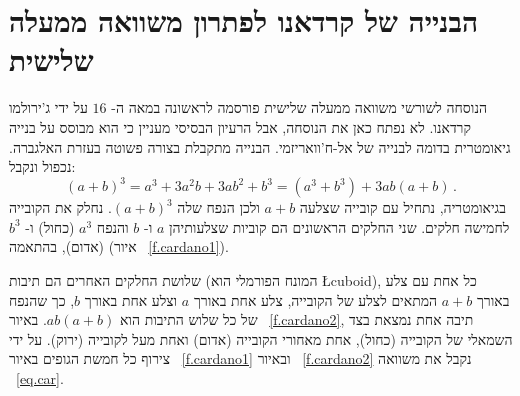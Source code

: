 
\section{הבנייה של
קרדאנו
לפתרון משוואה ממעלה שלישית}
\label{s.cardano}

הנוסחה לשורשי משוואה ממעלה שלישית פורסמה לראשונה במאה ה-%
$16$
על ידי ג'ירולמו קרדאנו.
לא נפתח כאן את הנוסחה, אבל הרעיון הבסיסי מעניין כי הוא מבוסס על בנייה גיאומטרית בדומה לבנייה של אל-ח'וואריזמי.
הבנייה מתקבלת בצורה פשוטה בעזרת האלגברה. נכפול ונקבל:
\begin{equation}\label{eq.car}
(a+b)^3=a^3+3a^2b+3ab^2+b^3=(a^3+b^3)+3ab(a+b)\,.
\end{equation}
בגיאומטריה, נתחיל עם קובייה שצלעה 
$a+b$
ולכן הנפח שלה 
$(a+b)^3$.
נחלק את הקובייה לחמישה חלקים. שני החלקים הראשונים הם קוביות שצלעותיהן  
$a$
ו-%
$b$
והנפח
$a^3$ (כחול)
ו-%
$b^3$ (אדום),
בהתאמה (איור%
~\ref{f.cardano1}).

שלושת החלקים האחרים הם תיבות (המונח הפורמלי הוא
\L{cuboid}),
כל אחת עם צלע באורך
$a+b$
המתאים לצלע של הקובייה, צלע אחת באורך
$a$
וצלע אחת באורך
$b$,
כך שהנפח של כל שלוש התיבות הוא
$ab(a+b)$.
באיור%
~\ref{f.cardano2},
תיבה אחת נמצאת בצד השמאלי של הקובייה (כחול), אחת מאחורי הקובייה (אדום) ואחת מעל לקובייה (ירוק). על ידי צירוף כל חמשת הגופים באיור%
~\ref{f.cardano1}
ובאיור%
~\ref{f.cardano2}
נקבל את משוואה
~\ref{eq.car}.

